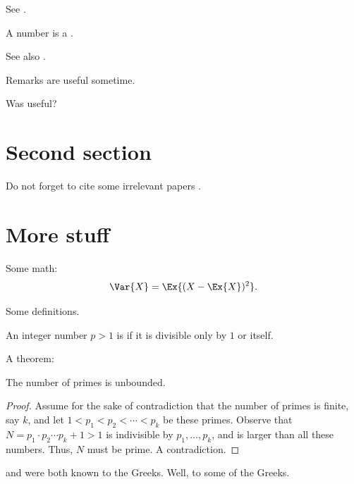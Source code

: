 \documentclass[12pt]{article}
\begin{document}
See .

\begin{definition}
    A number is a .
\end{definition}

See also .

\begin{remark}
    Remarks are useful sometime.
\end{remark}

Was  useful?

\section{Second section}


Do not forget to cite some irrelevant papers \cite{k-spda-10}.


\section{More stuff}
Some math:
\begin{equation*}
    \Var{X}%
    =%
    \Ex{(X - \Ex{X})^2}.
\end{equation*}

Some definitions.
\begin{defn}
    An integer number $p > 1$ is  if it is divisible
    only by $1$ or itself.
\end{defn}

A theorem:
\begin{theorem}
    The number of primes is unbounded.
\end{theorem}
\begin{proof}
    Assume for the sake of contradiction that the number of primes is
    finite, say $k$, and let $1 < p_1< p_2 < \cdots < p_k$ be these
    primes. Observe that $N = p_1 \cdot p_2 \cdots p_k +1 > 1$ is
    indivisible by $p_1, \ldots, p_k$, and is larger than all these
    numbers. Thus, $N$ must be prime. A contradiction.
\end{proof}

 and  were both known to the Greeks. Well,
to some of the Greeks.
\end{document}
